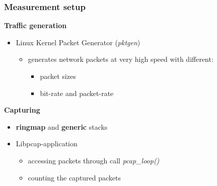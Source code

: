 \begin{frame}
\frametitle{Measurement setup}
\textbf{Traffic generation}
\begin{itemize}
	\item Linux Kernel Packet Generator (\emph{pktgen})
		\begin{itemize}
			\item generates network packets at very high speed with different: 
				\begin{itemize}
					\item packet sizes
					\item bit-rate and packet-rate
				\end{itemize}
		\end{itemize}
\end{itemize}
\textbf{Capturing}
\begin{itemize}
	\item \textbf{ringmap} and \textbf{generic} stacks
	\item Libpcap-application
		\begin{itemize}
			\item accessing packets through call \emph{pcap\_loop()}
			\item counting the captured packets
		\end{itemize}
\end{itemize}
\end{frame}

%

